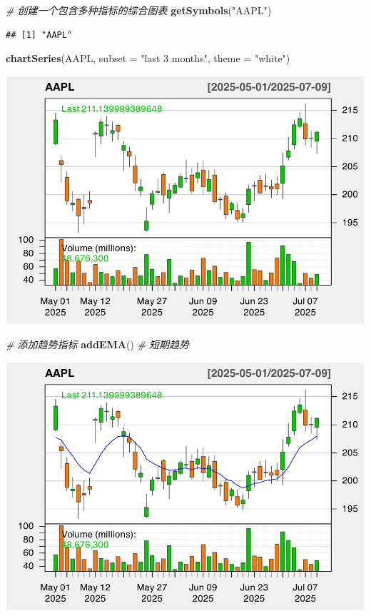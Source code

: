 \documentclass[]{ctexbook}
\newenvironment{Shaded}{\begin{snugshade}}{\end{snugshade}}
\newcommand{\AttributeTok}[1]{\textcolor[rgb]{0.13,0.29,0.53}{#1}}
\newcommand{\CommentTok}[1]{\textcolor[rgb]{0.56,0.35,0.01}{\textit{#1}}}
\newcommand{\FunctionTok}[1]{\textcolor[rgb]{0.13,0.29,0.53}{\textbf{#1}}}
\newcommand{\NormalTok}[1]{#1}
\newcommand{\StringTok}[1]{\textcolor[rgb]{0.31,0.60,0.02}{#1}}
\begin{document}
\begin{Shaded}
\begin{Highlighting}[]
\CommentTok{\# 创建一个包含多种指标的综合图表}
\FunctionTok{getSymbols}\NormalTok{(}\StringTok{"AAPL"}\NormalTok{)}
\end{Highlighting}
\end{Shaded}

\begin{verbatim}
## [1] "AAPL"
\end{verbatim}

\begin{Shaded}
\begin{Highlighting}[]
\FunctionTok{chartSeries}\NormalTok{(AAPL, }\AttributeTok{subset =} \StringTok{"last 3 months"}\NormalTok{, }\AttributeTok{theme =} \StringTok{"white"}\NormalTok{)}
\end{Highlighting}
\end{Shaded}

\includegraphics[width=0.9\linewidth]{quantmod_files/figure-latex/comprehensive-1}

\begin{Shaded}
\begin{Highlighting}[]
\CommentTok{\# 添加趋势指标}
\FunctionTok{addEMA}\NormalTok{()  }\CommentTok{\# 短期趋势}
\end{Highlighting}
\end{Shaded}

\includegraphics[width=0.9\linewidth]{quantmod_files/figure-latex/comprehensive-2}
\end{document}
